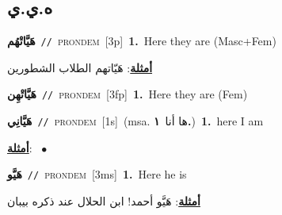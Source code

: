 \documentclass[10pt,a4paper,twoside]{article} %
\begin{document}
\begin{multicols}{2}
\vspace{-3mm}
\subsection*{\color{blue}\foreignlanguage{arabic}{ه.ي.ي}\color{blue}{ (ntws)}} 

{\setlength\topsep{0pt}\textbf{\foreignlanguage{arabic}{هَيَّاتْهُم}}\ {\color{gray}\texttt{//}\color{black}}\ \textsc{pron\textunderscore dem}\ [3p]\ \textbf{1.}~Here they are (Masc+Fem)\  \begin{flushright}\color{gray}\foreignlanguage{arabic}{\textbf{\underline{\foreignlanguage{arabic}{أمثلة}}}: هَيّاتهم الطلاب الشطورين}\end{flushright}\color{black}} \vspace{2mm}

{\setlength\topsep{0pt}\textbf{\foreignlanguage{arabic}{هَيَّاتْهِن}}\ {\color{gray}\texttt{//}\color{black}}\ \textsc{pron\textunderscore dem}\ [3fp]\ \textbf{1.}~Here they are (Fem)\ } \vspace{2mm}

{\setlength\topsep{0pt}\textbf{\foreignlanguage{arabic}{هَيَّانِي}}\ {\color{gray}\texttt{//}\color{black}}\ \textsc{pron\textunderscore dem}\ [1s]\ \color{gray}(msa. \foreignlanguage{arabic}{ها أنا}~\foreignlanguage{arabic}{\textbf{١.}})\color{black}\ \textbf{1.}~here I am\  \begin{flushright}\color{gray}\foreignlanguage{arabic}{\textbf{\underline{\foreignlanguage{arabic}{أمثلة}}}: \ $\bullet$\ \  }\end{flushright}\color{black}} \vspace{2mm}

{\setlength\topsep{0pt}\textbf{\foreignlanguage{arabic}{هَيَّو}}\ {\color{gray}\texttt{//}\color{black}}\ \textsc{pron\textunderscore dem}\ [3ms]\ \textbf{1.}~Here he is\  \begin{flushright}\color{gray}\foreignlanguage{arabic}{\textbf{\underline{\foreignlanguage{arabic}{أمثلة}}}: هَيَّو أحمد! ابن الحلال عند ذكره بيبان}\end{flushright}\color{black}} \vspace{2mm}


\end{multicols}
\end{document}
